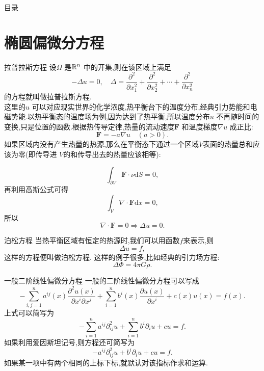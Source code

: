 \begin{frame}[t]{目录}
\tableofcontents
\end{frame}
\section{椭圆偏微分方程}
\begin{frame}[t]{拉普拉斯方程}
设$\Omega$ 是$\mathbb{R}^{n}$ 中的开集,则在该区域上满足
  \[
  -\Delta u =0, \quad \Delta = \frac{\partial ^2}{\partial x_1^2} +\frac{\partial ^2}{\partial x_2^2} +\cdots+\frac{\partial ^2}{\partial x_n^2} 
  \]
  的方程就叫做拉普拉斯方程.\\
  这里的$u$ 可以对应现实世界的化学浓度,热平衡台下的温度分布,经典引力势能和电磁势能.以热平衡态的温度场为例,因为达到了热平衡,所以温度分布$u$ 不再随时间的变换,只是位置的函数.根据热传导定律,热量的流动速度$\mathbf{F}$ 和温度梯度$\nabla u$ 成正比:
  \[
    \mathbf{F}=-a \nabla u \quad (a>0).
  \] 
  如果区域内没有产生热量的热源,那么在平衡态下通过一个区域$V$表面的热量总和应该为零(即传导进 $V$的和传导出去的热量应该相等):
\end{frame}
\begin{frame}
  \[
  \int_{\partial V}\mathbf{F}\cdot \nu \mathrm{d}S=0,
  \] 
  再利用高斯公式可得
 \[
  \int_{V}\nabla\cdot \mathbf{F}\mathrm{d}x =0,
  \] 
  所以
  \[
  \nabla\cdot \mathbf{F} = 0\Rightarrow \Delta u = 0. 
  \]  
\end{frame}
\begin{frame}[t]{泊松方程}
  当热平衡区域有恒定的热源时,我们可以用函数$f$来表示,则
   \[
 \Delta u = f,
  \] 
  这样的方程便叫做泊松方程.
  这样的例子很多,比如经典的引力场方程:
  \[
  \Delta \Phi = 4\pi G\rho.
  \] 

\end{frame}

\begin{frame}[t]{一般二阶线性偏微分方程}
 一般的二阶线性偏微分方程可以写成
  \[
    -\sum_{i,j=1}^{n} a^{ij}(x) \frac{\partial^2 u(x)}{\partial x^i\partial x^j}+\sum_{i=1}^{n} b^i(x) \frac{\partial u(x)}{\partial x^i}+c(x)u(x)=f(x).
  \] 
  上式可以简写为
  \[
  -\sum_{i=1}^{n} a^{ij}\partial^2_{ij}u+\sum_{i=1}^{n} b^i \partial_i u +cu = f.
  \] 
  如果利用爱因斯坦记号,则方程还可简写为
  \[
  -a^{ij}\partial_{ij}^2 u +b^i \partial_i u+cu =f.
  \] 
  如果某一项中有两个相同的上标下标,就默认对该指标作求和运算.
\end{frame}

